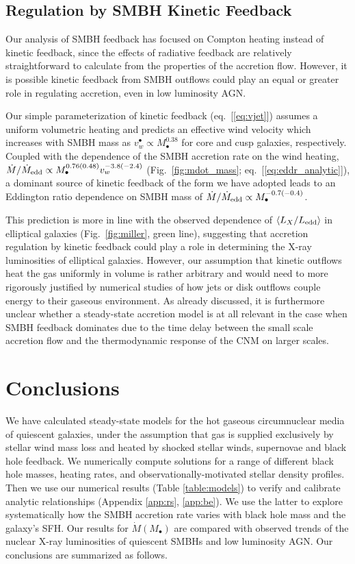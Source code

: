 \documentclass[usenatbib,fleqn]{mn2e}
\newcommand{\Mbh}[1][]{M_{\bullet#1}}
\begin{document}
\subsection{Regulation by SMBH Kinetic Feedback}
\label{sec:kinetic}

Our analysis of SMBH feedback has focused on Compton heating instead
of kinetic feedback, since the effects of radiative feedback are
relatively straightforward to calculate from the properties of the
accretion flow.  However, it is possible kinetic feedback from SMBH
outflows could play an equal or greater role in regulating accretion,
even in low luminosity AGN.

Our simple parameterization of kinetic feedback (eq.~[\ref{eq:vjet}])
assumes a uniform volumetric heating and predicts an effective wind
velocity which increases with SMBH mass as $v_{w}^{\bullet} \propto
M_{\bullet}^{0.38}$ for core and cusp galaxies, respectively.
Coupled with the dependence of the SMBH accretion rate on the wind
heating, $\dot{M}/\dot{M}_{\rm edd} \propto
M_{\bullet}^{0.76(0.48)}v_{w}^{-3.8(-2.4)}$ (Fig.~\ref{fig:mdot_mass};
eq.~[\ref{eq:eddr_analytic}]), a dominant source of kinetic feedback
of the form we have adopted leads to an Eddington ratio dependence on
SMBH mass of $\dot{M}/\dot{M}_{\rm edd} \propto
M_{\bullet}^{-0.7(-0.4)}$.

This prediction is more in line with the observed dependence of
$\langle L_{X}/L_{\rm edd} \rangle$ in elliptical galaxies
(Fig.~\ref{fig:miller}, green line), suggesting that accretion
regulation by kinetic feedback could play a role in determining the
X-ray luminosities of elliptical galaxies.  However, our assumption
that kinetic outflows heat the gas uniformly in volume is rather
arbitrary and would need to more rigorously justified by numerical
studies of how jets or disk outflows couple energy to their gaseous
environment.  As already discussed, it is furthermore unclear whether
a steady-state accretion model is at all relevant in the case when
SMBH feedback dominates due to the time delay between the small scale
accretion flow and the thermodynamic response of the CNM on larger
scales.


\section{Conclusions}
\label{sec:conclusions}

We have calculated steady-state models for the hot gaseous
circumnuclear media of quiescent galaxies, under the assumption that
gas is supplied exclusively by stellar wind mass loss and heated by
shocked stellar winds, supernovae and black hole feedback.  We
numerically compute solutions for a range of different black hole
masses, heating rates, and observationally-motivated stellar density
profiles.  Then we use our numerical results (Table
\ref{table:models}) to verify and calibrate analytic
relationships (Appendix \ref{app:rs}, \ref{app:be}).  We use the
latter to explore systematically how the SMBH accretion rate varies
with black hole mass and the galaxy's SFH.  Our results for
$\dot{M}(\Mbh)$ are compared with observed trends of the nuclear X-ray
luminosities of quiescent SMBHs and low luminosity AGN.  Our
conclusions are summarized as follows.
\end{document}
